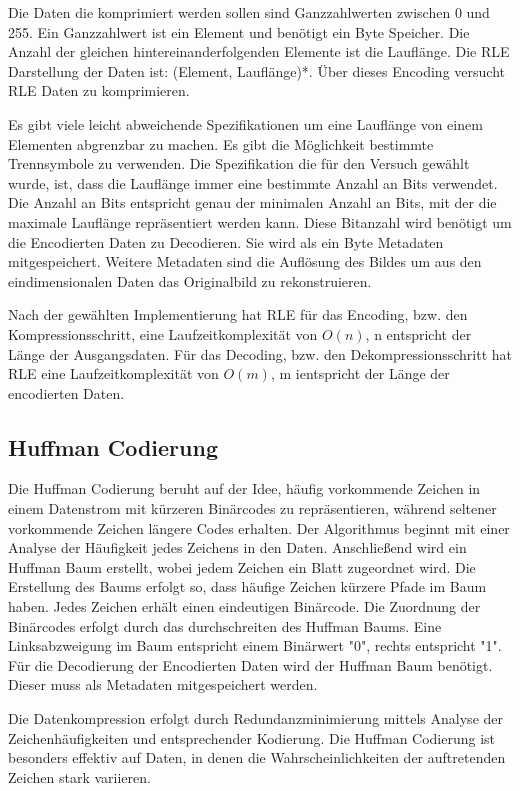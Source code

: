 \documentclass[conference]{IEEEtran}
\begin{document}
Die Daten die komprimiert werden sollen sind Ganzzahlwerten zwischen 0 und 255.
Ein Ganzzahlwert ist ein Element und benötigt ein Byte Speicher.
Die Anzahl der gleichen hintereinanderfolgenden Elemente ist die Lauflänge.
Die RLE Darstellung der Daten ist: (Element, Lauflänge)*.
Über dieses Encoding versucht RLE Daten zu komprimieren.

Es gibt viele leicht abweichende Spezifikationen um eine Lauflänge
von einem Elementen abgrenzbar zu machen.
Es gibt die Möglichkeit bestimmte Trennsymbole zu verwenden.
Die Spezifikation die für den Versuch gewählt wurde, ist,
dass die Lauflänge immer eine bestimmte Anzahl an Bits verwendet.
Die Anzahl an Bits entspricht genau der minimalen Anzahl an Bits,
mit der die maximale Lauflänge repräsentiert werden kann.
Diese Bitanzahl wird benötigt um die Encodierten Daten zu Decodieren.
Sie wird als ein Byte Metadaten mitgespeichert.
Weitere Metadaten sind die
Auflösung des Bildes um aus den eindimensionalen Daten das Originalbild
zu rekonstruieren.

Nach der gewählten Implementierung hat
RLE für das Encoding, bzw. den Kompressionsschritt, eine
Laufzeitkomplexität von $O(n)$, n entspricht der Länge der Ausgangsdaten.
Für das Decoding, bzw. den Dekompressionsschritt hat RLE eine
Laufzeitkomplexität von $O(m)$, m ientspricht der Länge der encodierten Daten. \cite{nick}

\subsection{Huffman Codierung}

Die Huffman Codierung beruht auf der Idee, häufig vorkommende Zeichen in einem Datenstrom
mit kürzeren Binärcodes zu repräsentieren, während seltener vorkommende Zeichen längere Codes
erhalten.
Der Algorithmus beginnt mit einer Analyse der Häufigkeit jedes Zeichens in den Daten.
Anschließend wird ein Huffman Baum erstellt, wobei jedem Zeichen ein Blatt zugeordnet wird.
Die Erstellung des Baums erfolgt so, dass häufige Zeichen kürzere Pfade im Baum haben.
Jedes Zeichen erhält einen eindeutigen Binärcode.
Die Zuordnung der Binärcodes erfolgt durch das durchschreiten des Huffman Baums.
Eine Linksabzweigung im Baum entspricht einem Binärwert "0", rechts entspricht "1".
Für die Decodierung der Encodierten Daten wird der Huffman Baum benötigt.
Dieser muss als Metadaten mitgespeichert werden.

Die Datenkompression erfolgt durch Redundanzminimierung mittels Analyse
der Zeichenhäufigkeiten und entsprechender Kodierung.
Die Huffman Codierung ist besonders effektiv auf Daten, in denen die
Wahrscheinlichkeiten der auftretenden Zeichen stark variieren.
\cite{moffat}
\end{document}
